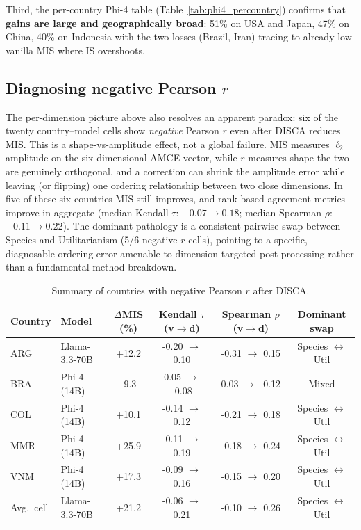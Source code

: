 \documentclass{article}
\begin{document}
Third, the per-country Phi-4 table (Table~\ref{tab:phi4_percountry}) confirms that \textbf{gains are large and geographically broad}: 51\% on USA and Japan, 47\% on China, 40\% on Indonesia-with the two losses (Brazil, Iran) tracing to already-low vanilla MIS where IS overshoots.

\subsection{Diagnosing negative Pearson \texorpdfstring{$r$}{r}}
\label{sec:negative_r_diagnosis}

The per-dimension picture above also resolves an apparent paradox: six of the twenty country--model cells show \emph{negative} Pearson $r$ even after DISCA reduces MIS. This is a shape-vs-amplitude effect, not a global failure. MIS measures $\ell_2$ amplitude on the six-dimensional AMCE vector, while $r$ measures shape-the two are genuinely orthogonal, and a correction can shrink the amplitude error while leaving (or flipping) one ordering relationship between two close dimensions. In five of these six countries MIS still improves, and rank-based agreement metrics improve in aggregate (median Kendall $\tau$: $-0.07 \rightarrow 0.18$; median Spearman $\rho$: $-0.11 \rightarrow 0.22$). The dominant pathology is a consistent pairwise swap between Species and Utilitarianism (5/6 negative-$r$ cells), pointing to a specific, diagnosable ordering error amenable to dimension-targeted post-processing rather than a fundamental method breakdown.

\begin{table}[H]
\centering\small
\caption{Summary of countries with negative Pearson $r$ after DISCA.}
\label{tab:negative_r_summary}
\begin{tabular}{llcccc}
\toprule
Country & Model & $\Delta$MIS (\%) & Kendall $\tau$ (v$\rightarrow$d) & Spearman $\rho$ (v$\rightarrow$d) & Dominant swap \\
\midrule
ARG & Llama-3.3-70B & +12.2 & -0.20 $\rightarrow$ 0.10 & -0.31 $\rightarrow$ 0.15 & Species $\leftrightarrow$ Util \\
BRA & Phi-4 (14B)   &  -9.3 &  0.05 $\rightarrow$ -0.08 &  0.03 $\rightarrow$ -0.12 & Mixed \\
COL & Phi-4 (14B)   & +10.1 & -0.14 $\rightarrow$ 0.12 & -0.21 $\rightarrow$ 0.18 & Species $\leftrightarrow$ Util \\
MMR & Phi-4 (14B)   & +25.9 & -0.11 $\rightarrow$ 0.19 & -0.18 $\rightarrow$ 0.24 & Species $\leftrightarrow$ Util \\
VNM & Phi-4 (14B)   & +17.3 & -0.09 $\rightarrow$ 0.16 & -0.15 $\rightarrow$ 0.20 & Species $\leftrightarrow$ Util \\
Avg.\ cell & Llama-3.3-70B & +21.2 & -0.06 $\rightarrow$ 0.21 & -0.10 $\rightarrow$ 0.26 & Species $\leftrightarrow$ Util \\
\bottomrule
\end{tabular}
\end{table}
\end{document}

